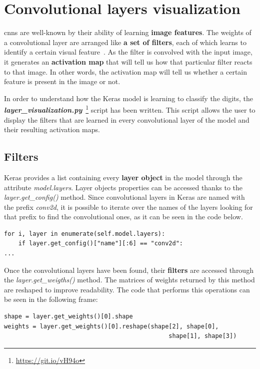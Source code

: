 \section{Convolutional layers visualization}\label{sec:visualization}
\glspl{cnn} are well-known by their ability of learning \textbf{image features}. The weights of a convolutional layer are arranged like \textbf{a set of filters}, each of which learns to identify a certain visual feature~\cite{cs231n}. As the filter is convolved with the input image, it generates an \textbf{activation map} that will tell us how that particular filter reacts to that image. In other words, the activation map will tell us whether a certain feature is present in the image or not.

In order to understand how the Keras model is learning to classify the digits, the \textbf{\textit{layer\_visualization.py}}~\footnote{\url{https://git.io/vH94o}} script has been written. This script allows the user to display the filters that are learned in every convolutional layer of the model and their resulting activation maps.

\subsection{Filters}
Keras provides a list containing every \textbf{layer object} in the model through the attribute \textit{model.layers}. Layer objects properties can be accessed thanks to the \textit{layer.get\_config()} method. Since convolutional layers in Keras are named with the prefix \textit{conv2d}, it is possible to iterate over the names of the layers looking for that prefix to find the convolutional ones, as it can be seen in the code below.

\begin{lstlisting}
for i, layer in enumerate(self.model.layers):
	if layer.get_config()["name"][:6] == "conv2d":
...
\end{lstlisting}

Once the convolutional layers have been found, their \textbf{filters} are accessed through the \textit{layer.get\_weigths()} method. The matrices of weights returned by this method are reshaped to improve readability. The code that performs this operations can be seen in the following frame:

\begin{lstlisting}
shape = layer.get_weights()[0].shape
weights = layer.get_weights()[0].reshape(shape[2], shape[0],
                                              shape[1], shape[3])
\end{lstlisting}

